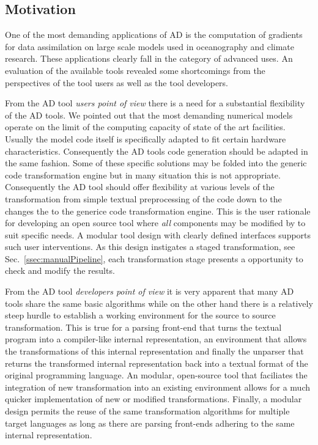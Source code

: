 \documentclass[11pt]{article}
\newcommand{\refsec}[1]{{Sec.~\ref{#1}}}
\begin{document}
\subsection{Motivation}
One of the most demanding applications of AD is the computation of gradients for 
data assimilation on large scale models used in oceanography and climate research. 
These applications clearly fall in the category of advanced uses.
An evaluation of the available tools revealed some shortcomings from the perspectives 
of the tool users as well as the tool developers. 

From  the AD tool  {\em users point of view} there is a need for a substantial 
flexibility of the AD tools. 
We pointed out that the most demanding  numerical models 
operate on the limit of the computing capacity of state of the art facilities. 
Usually the model code itself is specifically adapted to fit certain 
hardware characteristics. 
Consequently the AD tools code generation should be adapted in the same fashion. 
Some of these specific solutions may be folded into the generic code transformation engine 
but in many situation this is not appropriate.
Consequently the AD tool should offer flexibility at various levels of the 
transformation from simple textual preprocessing of the code down to the 
changes the to the generice code transformation engine.
This is the user rationale for developing an open source tool where {\em all} 
components may be modified by to suit specific 
needs.  
A modular tool design with clearly defined interfaces supports such 
user interventions. 
As this design instigates a staged 
transformation, see \refsec{ssec:manualPipeline}, 
each transformation stage presents a opportunity to check and modify the 
results. 

From the AD tool {\em developers point of view} it is very apparent that 
many AD tools share the same basic algorithms while on the other hand 
there is a relatively steep hurdle to establish a working environment 
for the source to source transformation. 
This is true for a parsing front-end that turns the textual program into a 
compiler-like internal representation, an environment that allows the 
transformations  of this internal representation and finally the unparser that 
returns the transformed internal representation back into a textual format of the 
original programming language. An modular, open-source tool that faciliates 
the integration of new transformation into an existing environment 
allows for a much quicker implementation of new or modified  transformations.
Finally, a modular design permits the reuse of the same transformation algorithms 
for multiple target languages as long as there are parsing front-ends adhering to the 
same internal representation.
\end{document}
